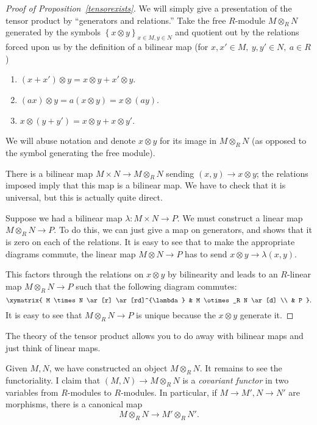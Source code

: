 \begin{proof}[Proof of Proposition~\ref{tensorexists}] We will simply give a presentation of the tensor product by
``generators and relations.'' 
Take the free $R$-module $M \otimes_R N$ generated by the symbols $\left\{x \otimes
y\right\}_{x \in M, y \in N}$ and quotient out by the relations forced upon us
by the definition of a bilinear map (for $x, x' \in M, \  y, y' \in N, \   a
\in R$)
\begin{enumerate}
\item  $(x+x') \otimes y = x \otimes y + x' \otimes y$.
\item $(ax) \otimes y = a(x \otimes y) = x \otimes (ay)$. 
\item  $x \otimes (y+y') = x \otimes y + x \otimes y'$.
\end{enumerate}

We will abuse notation and denote $x \otimes y$ for its image in $M \otimes_R
N$ (as opposed to the symbol generating the free module).

There is a bilinear map $M \times N \to M \otimes_R N$ sending $(x,y) \to x
\otimes y$; the relations imposed imply  that this map is a bilinear map. We have to check
that it is universal, but this is actually quite direct. 

Suppose we had a bilinear map $\lambda: M \times N \to P$.  We must construct a linear map $M
\otimes_R N \to P$.  
To do this, we can just give a map on generators, and shows that it is zero on
each of the relations.
It is easy to see that to make the appropriate diagrams commute, the linear map $M \otimes N \to P$ has to send $x \otimes y \to \lambda(x,y)$.  

This factors
through the relations on $x \otimes y$ by bilinearity and leads to an
$R$-linear map $M \otimes_{R} N \to P$ such that the following diagram commutes:
\[ 
\xymatrix{
M \times N \ar[r] \ar[rd]^{\lambda} &  M \otimes_R N \ar[d] \\ 
& P
}.\]
It is easy to see that $M \otimes_R N \to P$ is unique because the $x \otimes
y$ generate it. 
\end{proof} 


The theory of the tensor product allows you to do away with bilinear maps and
just think of linear maps.

Given $M, N$, we have constructed an object $M \otimes_R N$. It remains to see
the functoriality. I claim that $(M,N) \to M \otimes_R N$ is a \emph{covariant
functor} in two variables from $R$-modules to $R$-modules. 
In particular, if $M \to M', N \to N'$ are morphisms, there is a canonical map
\[ M \otimes_R N \to M' \otimes_R N'.  \]


